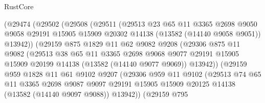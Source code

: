 \begin{lexlean}{RustCore}
\begin{coremodule}
                  (@29474
                    (@29502
                      (@29508
                        (@29511
                          (@29513
                            @23
                            @65
                            @11
                            @3365
                            @2698
                            @9050
                            @9058
                            @29191
                            @15905
                            @15909
                            @20302
                            @14138
                            (@13582 (@14140 @9058 @9051))
                            @13942))
                        (@29159
                          @875
                          @1829
                          @11
                          @62
                          @9082
                          @9208
                          (@29306
                            @875
                            @11
                            @9082
                            (@29513
                              @38
                              @65
                              @11
                              @3365
                              @2698
                              @9068
                              @9077
                              @29191
                              @15905
                              @15909
                              @20199
                              @14138
                              (@13582 (@14140 @9077 @9069))
                              @13942))
                          (@29159
                            @959
                            @1828
                            @11
                            @61
                            @9102
                            @9207
                            (@29306
                              @959
                              @11
                              @9102
                              (@29513
                                @74
                                @65
                                @11
                                @3365
                                @2698
                                @9087
                                @9097
                                @29191
                                @15905
                                @15909
                                @20125
                                @14138
                                (@13582 (@14140 @9097 @9088))
                                @13942))
                            (@29159
                              @795

\end{coremodule}
\end{lexlean}
